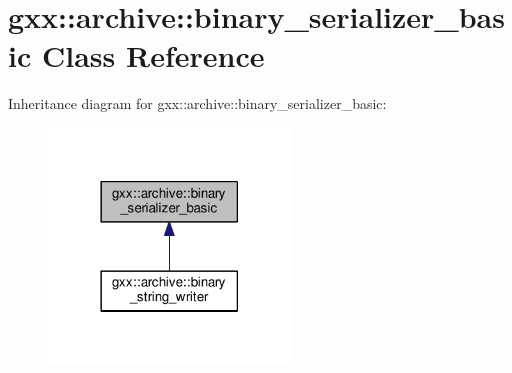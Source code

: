 \hypertarget{classgxx_1_1archive_1_1binary__serializer__basic}{}\section{gxx\+:\+:archive\+:\+:binary\+\_\+serializer\+\_\+basic Class Reference}
\label{classgxx_1_1archive_1_1binary__serializer__basic}


Inheritance diagram for gxx\+:\+:archive\+:\+:binary\+\_\+serializer\+\_\+basic\+:
\nopagebreak
\begin{figure}[H]
\begin{center}
\leavevmode
\includegraphics[width=182pt]{classgxx_1_1archive_1_1binary__serializer__basic__inherit__graph}
\end{center}
\end{figure}
